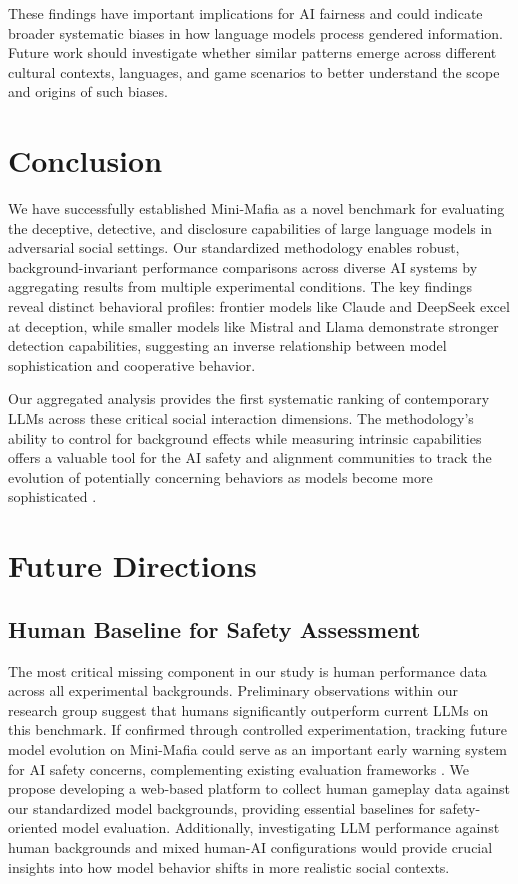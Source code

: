 \documentclass{article}
\begin{document}
These findings have important implications for AI fairness and could indicate broader systematic biases in how language models process gendered information. Future work should investigate whether similar patterns emerge across different cultural contexts, languages, and game scenarios to better understand the scope and origins of such biases.





\section{Conclusion}

We have successfully established Mini-Mafia as a novel benchmark for evaluating the deceptive, detective, and disclosure capabilities of large language models in adversarial social settings. Our standardized methodology enables robust, background-invariant performance comparisons across diverse AI systems by aggregating results from multiple experimental conditions. The key findings reveal distinct behavioral profiles: frontier models like Claude and DeepSeek excel at deception, while smaller models like Mistral and Llama demonstrate stronger detection capabilities, suggesting an inverse relationship between model sophistication and cooperative behavior.

Our aggregated analysis provides the first systematic ranking of contemporary LLMs across these critical social interaction dimensions. The methodology's ability to control for background effects while measuring intrinsic capabilities offers a valuable tool for the AI safety and alignment communities to track the evolution of potentially concerning behaviors as models become more sophisticated \citep{hendrycks2023overview, morris2023levels}.

\section{Future Directions}

\subsection{Human Baseline for Safety Assessment}

The most critical missing component in our study is human performance data across all experimental backgrounds. Preliminary observations within our research group suggest that humans significantly outperform current LLMs on this benchmark. If confirmed through controlled experimentation, tracking future model evolution on Mini-Mafia could serve as an important early warning system for AI safety concerns, complementing existing evaluation frameworks \citep{sennott2023machiavelli, mao2023alympics}. We propose developing a web-based platform to collect human gameplay data against our standardized model backgrounds, providing essential baselines for safety-oriented model evaluation. Additionally, investigating LLM performance against human backgrounds and mixed human-AI configurations would provide crucial insights into how model behavior shifts in more realistic social contexts.
\end{document}
